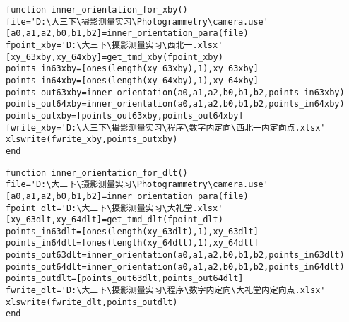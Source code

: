 \begin{lstlisting}[caption=inner\_orientation\_for\_xby.m]
function inner_orientation_for_xby()
file='D:\大三下\摄影测量实习\Photogrammetry\camera.use'
[a0,a1,a2,b0,b1,b2]=inner_orientation_para(file)
fpoint_xby='D:\大三下\摄影测量实习\西北一.xlsx'
[xy_63xby,xy_64xby]=get_tmd_xby(fpoint_xby)
points_in63xby=[ones(length(xy_63xby),1),xy_63xby]
points_in64xby=[ones(length(xy_64xby),1),xy_64xby]
points_out63xby=inner_orientation(a0,a1,a2,b0,b1,b2,points_in63xby)
points_out64xby=inner_orientation(a0,a1,a2,b0,b1,b2,points_in64xby)
points_outxby=[points_out63xby,points_out64xby]
fwrite_xby='D:\大三下\摄影测量实习\程序\数字内定向\西北一内定向点.xlsx'
xlswrite(fwrite_xby,points_outxby)
end
\end{lstlisting}

\begin{lstlisting}[caption=inner\_orientation\_for\_dlt.m]
function inner_orientation_for_dlt()
file='D:\大三下\摄影测量实习\Photogrammetry\camera.use'
[a0,a1,a2,b0,b1,b2]=inner_orientation_para(file)
fpoint_dlt='D:\大三下\摄影测量实习\大礼堂.xlsx'
[xy_63dlt,xy_64dlt]=get_tmd_dlt(fpoint_dlt)
points_in63dlt=[ones(length(xy_63dlt),1),xy_63dlt]
points_in64dlt=[ones(length(xy_64dlt),1),xy_64dlt]
points_out63dlt=inner_orientation(a0,a1,a2,b0,b1,b2,points_in63dlt)
points_out64dlt=inner_orientation(a0,a1,a2,b0,b1,b2,points_in64dlt)
points_outdlt=[points_out63dlt,points_out64dlt]
fwrite_dlt='D:\大三下\摄影测量实习\程序\数字内定向\大礼堂内定向点.xlsx'
xlswrite(fwrite_dlt,points_outdlt)
end
\end{lstlisting}

